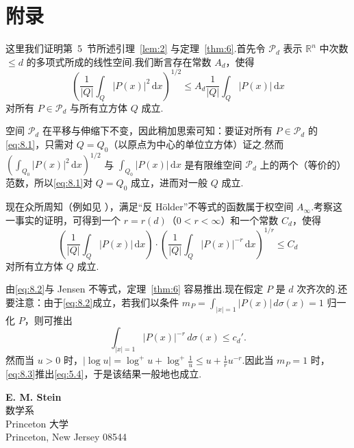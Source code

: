 \documentclass[
  BookTitleCN={傅里叶分析中的振动积分},
  BookTitleEN={Oscillatory Integrals in Fourier Analysis},
  OriginalAuthor={E.~M. Stein},
  OriginalEdition={Proc. Sympos. Pure Math. 35, Part~1},
  OriginalPublisher={American Mathematical Society},
  OriginalYear={1979},
  Translator={翻译及重排},
  ModelUsed={Codex CLI},
  Biblatex=false,
  TranslationDate={2026年8月27日}
]{mathtranslation}
\numberwithin{equation}{chapter}   %
\newcommand{\R}{\mathbb{R}}
\begin{document}
\chapter{附录}

\noindent 这里我们证明第~5~节所述引理~\ref{lem:2} 与定理~\ref{thm:6}.首先令 $\mathcal{P}_{d}$ 表示 $\R^{n}$ 中次数 $\leq d$ 的多项式所成的线性空间.我们断言存在常数 $A_{d}$，使得
\begin{equation}
  \left(\frac{1}{|Q|}\int_{Q}|P(x)|^{2}\,\mathrm{d}x\right)^{1/2}\leq A_{d}\frac{1}{|Q|}\int_{Q}|P(x)|\,\mathrm{d}x \label{eq:8.1}
\end{equation}
对所有 $P\in\mathcal{P}_{d}$ 与所有立方体 $Q$ 成立.

空间 $\mathcal{P}_{d}$ 在平移与伸缩下不变，因此稍加思索可知：要证对所有 $P\in\mathcal{P}_{d}$ 的\eqref{eq:8.1}，只需对 $Q=Q_{0}$（以原点为中心的单位立方体）证之.然而 $\left(\int_{Q_{0}}|P(x)|^{2}\,\mathrm{d}x\right)^{1/2}$ 与 $\int_{Q_{0}}|P(x)|\,\mathrm{d}x$ 是有限维空间 $\mathcal{P}_{d}$ 上的两个（等价的）范数，所以\eqref{eq:8.1}对 $Q=Q_{0}$ 成立，进而对一般 $Q$ 成立.

现在众所周知（例如见 \cite{ref6}），满足``反 H\"older''不等式的函数属于权空间 $A_{\infty}$.考察这一事实的证明，可得到一个 $r=r(d)$（$0<r<\infty$）和一个常数 $C_{d}$，使得
\begin{equation}
  \left(\frac{1}{|Q|}\int_{Q}|P(x)|\,\mathrm{d}x\right)\cdot\left(\frac{1}{|Q|}\int_{Q}|P(x)|^{-r}\,\mathrm{d}x\right)^{1/r}\leq C_{d} \label{eq:8.2}
\end{equation}
对所有立方体 $Q$ 成立.

由\eqref{eq:8.2}与 Jensen 不等式，定理~\ref{thm:6} 容易推出.现在假定 $P$ 是 $d$ 次齐次的.还要注意：由于\eqref{eq:8.2}成立，若我们以条件 $m_{P}=\int_{|x|=1}|P(x)|\,d\sigma(x)=1$ 归一化 $P$，则可推出
\begin{equation}
  \int_{|x|=1}|P(x)|^{-r}\,d\sigma(x)\leq c_{d}' . \label{eq:8.3}
  \end{equation}
然而当 $u>0$ 时，$|\log u|=\log^{+}u+\log^{+}\frac{1}{u}\leq u+\frac{1}{r}u^{-r}$.因此当 $m_{P}=1$ 时，\eqref{eq:8.3}推出\eqref{eq:5.4}，于是该结果一般地也成立.

\bigskip
\begin{flushright}
  \textbf{E. M. Stein}\\
  数学系\\
  Princeton 大学\\
  Princeton, New Jersey 08544
\end{flushright}
\end{document}
